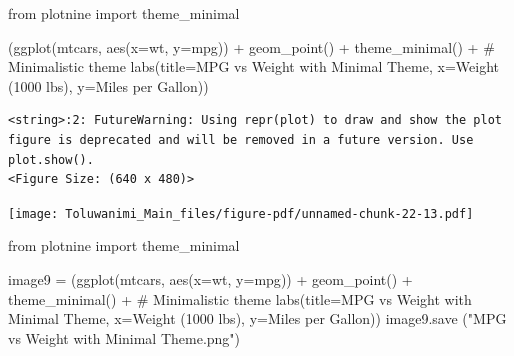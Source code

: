 \documentclass[
  letterpaper,
  DIV=11,
  numbers=noendperiod]{scrreprt}
\newenvironment{Shaded}{\begin{snugshade}}{\end{snugshade}}
\newcommand{\CommentTok}[1]{\textcolor[rgb]{0.37,0.37,0.37}{#1}}
\newcommand{\ImportTok}[1]{\textcolor[rgb]{0.00,0.46,0.62}{#1}}
\newcommand{\NormalTok}[1]{\textcolor[rgb]{0.00,0.23,0.31}{#1}}
\newcommand{\OperatorTok}[1]{\textcolor[rgb]{0.37,0.37,0.37}{#1}}
\newcommand{\StringTok}[1]{\textcolor[rgb]{0.13,0.47,0.30}{#1}}
\begin{document}
\begin{Shaded}
\begin{Highlighting}[]
\ImportTok{from}\NormalTok{ plotnine }\ImportTok{import}\NormalTok{ theme\_minimal}

\NormalTok{(ggplot(mtcars, aes(x}\OperatorTok{=}\StringTok{\textquotesingle{}wt\textquotesingle{}}\NormalTok{, y}\OperatorTok{=}\StringTok{\textquotesingle{}mpg\textquotesingle{}}\NormalTok{)) }\OperatorTok{+}
\NormalTok{ geom\_point() }\OperatorTok{+}
\NormalTok{ theme\_minimal() }\OperatorTok{+}  \CommentTok{\# Minimalistic theme}
\NormalTok{ labs(title}\OperatorTok{=}\StringTok{\textquotesingle{}MPG vs Weight with Minimal Theme\textquotesingle{}}\NormalTok{,}
\NormalTok{      x}\OperatorTok{=}\StringTok{\textquotesingle{}Weight (1000 lbs)\textquotesingle{}}\NormalTok{,}
\NormalTok{      y}\OperatorTok{=}\StringTok{\textquotesingle{}Miles per Gallon\textquotesingle{}}\NormalTok{))}
\end{Highlighting}
\end{Shaded}

\begin{verbatim}
<string>:2: FutureWarning: Using repr(plot) to draw and show the plot figure is deprecated and will be removed in a future version. Use plot.show().
<Figure Size: (640 x 480)>
\end{verbatim}

\texttt{[image: Toluwanimi\_Main\_files/figure-pdf/unnamed-chunk-22-13.pdf]}

\begin{Shaded}
\begin{Highlighting}[]
\ImportTok{from}\NormalTok{ plotnine }\ImportTok{import}\NormalTok{ theme\_minimal}

\NormalTok{image9 }\OperatorTok{=}\NormalTok{ (ggplot(mtcars, aes(x}\OperatorTok{=}\StringTok{\textquotesingle{}wt\textquotesingle{}}\NormalTok{, y}\OperatorTok{=}\StringTok{\textquotesingle{}mpg\textquotesingle{}}\NormalTok{)) }\OperatorTok{+}
\NormalTok{ geom\_point() }\OperatorTok{+}
\NormalTok{ theme\_minimal() }\OperatorTok{+}  \CommentTok{\# Minimalistic theme}
\NormalTok{ labs(title}\OperatorTok{=}\StringTok{\textquotesingle{}MPG vs Weight with Minimal Theme\textquotesingle{}}\NormalTok{,}
\NormalTok{      x}\OperatorTok{=}\StringTok{\textquotesingle{}Weight (1000 lbs)\textquotesingle{}}\NormalTok{,}
\NormalTok{      y}\OperatorTok{=}\StringTok{\textquotesingle{}Miles per Gallon\textquotesingle{}}\NormalTok{))}
\NormalTok{image9.save (}\StringTok{"MPG vs Weight with Minimal Theme.png"}\NormalTok{)}
\end{Highlighting}
\end{Shaded}
\end{document}
